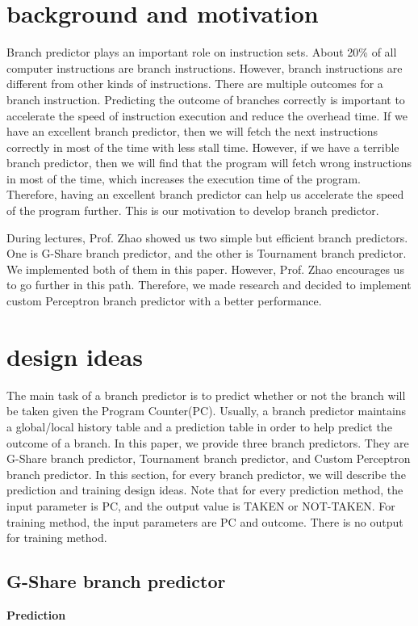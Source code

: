 \documentclass[conference]{IEEEtran}
\begin{document}
\section{background and motivation}
Branch predictor plays an important role on instruction sets. About 20\% of all computer instructions are branch instructions. However, branch instructions are
different from other kinds of instructions. There are multiple outcomes for a branch instruction. Predicting the outcome of branches correctly is important to accelerate the speed of instruction execution and reduce the overhead time. 
If we have an excellent branch predictor, then we will fetch the next instructions correctly in most of the time with less stall time. However, if we have a terrible branch predictor, then
we will find that the program will fetch wrong instructions in most of the time, which increases the execution time of the program. Therefore, having an excellent branch predictor can help us
accelerate the speed of the program further. This is our motivation to develop branch predictor. 

During lectures, Prof. Zhao showed us two simple but efficient branch predictors. One is G-Share branch predictor, and 
the other is Tournament branch predictor. We implemented both of them in this paper. However, Prof. Zhao encourages us to go further in this path. Therefore, we made research and decided to implement custom 
Perceptron branch predictor with a better performance. 

\section{design ideas}
The main task of a branch predictor is to predict whether or not the branch will be taken given the Program Counter(PC). Usually, a branch predictor maintains a global/local history table and a prediction table
in order to help predict the outcome of a branch. In this paper, we provide three branch predictors. They are G-Share branch predictor, Tournament branch predictor, and Custom Perceptron branch predictor. 
In this section, for every branch predictor, we will describe the prediction and training design ideas. Note that for every prediction method, the input parameter is PC, and the output value is TAKEN or NOT-TAKEN. For 
training method, the input parameters are PC and outcome. There is no output for training method. 
\subsection{G-Share branch predictor}
\begin{center}
  \textbf{Prediction}
\end{center}
\end{document}

